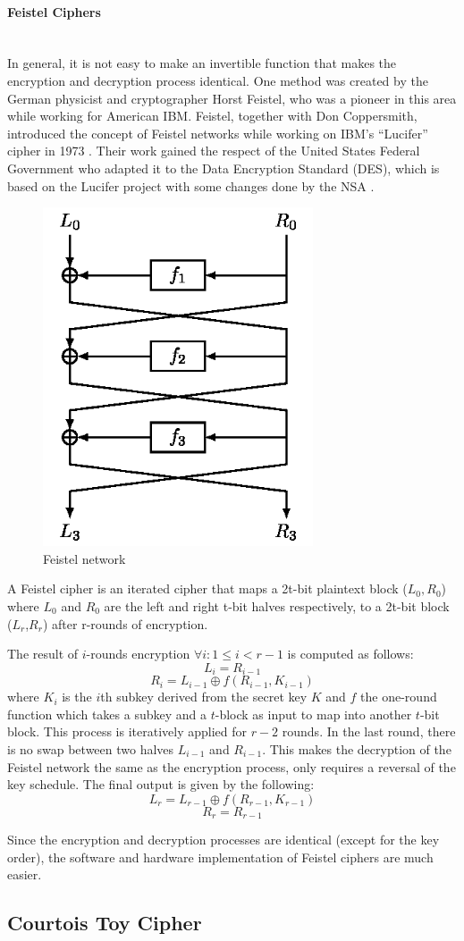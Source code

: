 \paragraph{Feistel Ciphers}\label{sec:feistel} \mbox{} \\
In general, it is not easy to make an invertible function that makes the encryption and decryption process identical. One method was created by the German physicist and cryptographer Horst Feistel, who was a pioneer in this area while working for American IBM. Feistel, together with Don Coppersmith, introduced the concept of Feistel networks while working on IBM's ``Lucifer'' cipher in 1973 \cite{feistel1973cryptography}. Their work gained the respect of the United States Federal Government who adapted it to the Data Encryption Standard (DES), which is based on the Lucifer project with some changes done by the NSA \cite{pub197746}.
\begin{figure}[h!]
	\centering
	\includegraphics[width=80mm]{./pics/fofKW.png}
	\caption{Feistel network}
	\label{Fig:FeistelNet}
\end{figure}
\begin{mydef}	
A Feistel cipher is an iterated cipher that maps a 2t-bit plaintext block ($L_{0},R_{0}$) where $L_{0}$ and $ R_{0}$ are the left and right t-bit halves respectively, to a 2t-bit block ($L_{r}$,$R_{r}$) after r-rounds of encryption.
\end{mydef}
The result of $i$-rounds encryption $\forall i : 1 \leq i < r - 1 $ is computed as follows:
$$ L_{i} = R_{i-1}$$
$$ R_{i} = L_{i-1} \oplus f(R_{i-1},K_{i-1})$$
where $K_{i}$ is the $i$th subkey derived from the secret key $K$ and $f$ the one-round function which takes a subkey and a $t$-block as input to map into another $t$-bit block. This process is iteratively applied for $r - 2$ rounds. In the last round, there is no swap between two halves $L_{i-1}$ and $R_{i-1}$. This makes the decryption of the Feistel network the same as the encryption process, only requires a reversal of the key schedule. The final output is given by the following: $$ L_{r} = L_{r-1} \oplus f(R_{r-1},K_{r-1})$$
$$R_{r} = R_{r-1}$$

Since the encryption and decryption processes are identical (except for the key order), the software and hardware implementation of Feistel ciphers are much easier. 
\subsection{Courtois Toy Cipher}
